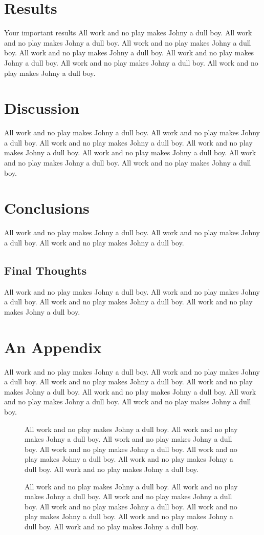 \documentclass[12pt]{orstthesis}
\begin{document}
\chapter{Results}
Your important results
All work and no play makes Johny a dull boy.
All work and no play makes Johny a dull boy.
All work and no play makes Johny a dull boy.
All work and no play makes Johny a dull boy.
All work and no play makes Johny a dull boy.
All work and no play makes Johny a dull boy.
All work and no play makes Johny a dull boy.
\chapter{Discussion}
All work and no play makes Johny a dull boy.
All work and no play makes Johny a dull boy.
All work and no play makes Johny a dull boy.
All work and no play makes Johny a dull boy.
All work and no play makes Johny a dull boy.
All work and no play makes Johny a dull boy.
All work and no play makes Johny a dull boy.
\chapter{Conclusions}
All work and no play makes Johny a dull boy.
All work and no play makes Johny a dull boy.
All work and no play makes Johny a dull boy.
\section{Final Thoughts}
All work and no play makes Johny a dull boy.
All work and no play makes Johny a dull boy.
All work and no play makes Johny a dull boy.
All work and no play makes Johny a dull boy.


\backmatter
\appendices
\chapter{An Appendix}
All work and no play makes Johny a dull boy.
All work and no play makes Johny a dull boy.
All work and no play makes Johny a dull boy.
All work and no play makes Johny a dull boy.
All work and no play makes Johny a dull boy.
All work and no play makes Johny a dull boy.
All work and no play makes Johny a dull boy.
\begin{figure}
\caption[
All work and no play makes Johny a dull boy.
]{
All work and no play makes Johny a dull boy.
All work and no play makes Johny a dull boy.
All work and no play makes Johny a dull boy.
All work and no play makes Johny a dull boy.
All work and no play makes Johny a dull boy.
All work and no play makes Johny a dull boy.
All work and no play makes Johny a dull boy.
}
\end{figure}
\begin{figure}
\caption[
All work and no play makes Johny a dull boy.
]{
All work and no play makes Johny a dull boy.
All work and no play makes Johny a dull boy.
All work and no play makes Johny a dull boy.
All work and no play makes Johny a dull boy.
All work and no play makes Johny a dull boy.
All work and no play makes Johny a dull boy.
All work and no play makes Johny a dull boy.
}
\end{figure}
\printindex
\flyleaf
\end{document}
